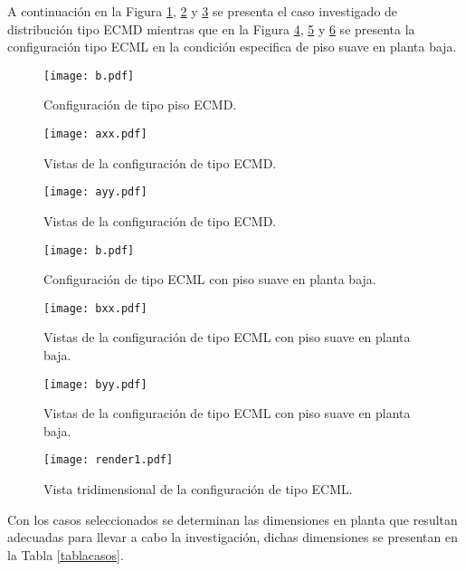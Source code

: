 \newpage

A continuaci\'on en la Figura \ref{fig:casosa1}, \ref{fig:casosa2} y \ref{fig:casosa3} se presenta el caso investigado de distribuci\'on tipo ECMD mientras que en la Figura \ref{fig:casosb1}, \ref{fig:casosb2} y \ref{fig:casosb3} se presenta la configuraci\'on tipo ECML en la condici\'on especifica de piso suave en planta baja. 

\begin{figure} [htbp]
\centering
\texttt{[image: b.pdf]}
\caption{Configuraci\'on de tipo piso ECMD.}
\label{fig:casosa1}
\end{figure}

\begin{figure} [htbp]
\centering
\texttt{[image: axx.pdf]}
\caption{Vistas de la configuraci\'on de tipo ECMD.}
\label{fig:casosa2}
\end{figure}

\begin{figure} [htbp]
\centering
\texttt{[image: ayy.pdf]}
\caption{Vistas de la configuraci\'on de tipo ECMD.}
\label{fig:casosa3}
\end{figure}

\begin{figure} [htbp]
\centering
\texttt{[image: b.pdf]}
\caption{Configuraci\'on de tipo ECML con piso suave en planta baja.}
\label{fig:casosb1}
\end{figure}

\begin{figure} [htbp]
\centering
\texttt{[image: bxx.pdf]}
\caption{Vistas de la configuraci\'on de tipo ECML con piso suave en planta baja.}
\label{fig:casosb2}
\end{figure}

\begin{figure} [htbp]
\centering
\texttt{[image: byy.pdf]}
\caption{Vistas de la configuraci\'on de tipo ECML con piso suave en planta baja.}
\label{fig:casosb3}
\end{figure}

\begin{figure} [htbp]
\centering
\texttt{[image: render1.pdf]}
\caption{Vista tridimensional de la configuraci\'on de tipo ECML.}
\label{fig:casosb3r}
\end{figure}

Con los casos seleccionados se determinan las dimensiones en planta que resultan adecuadas para llevar a cabo la investigaci\'on, dichas dimensiones se presentan en la Tabla \ref{tablacasos}.

